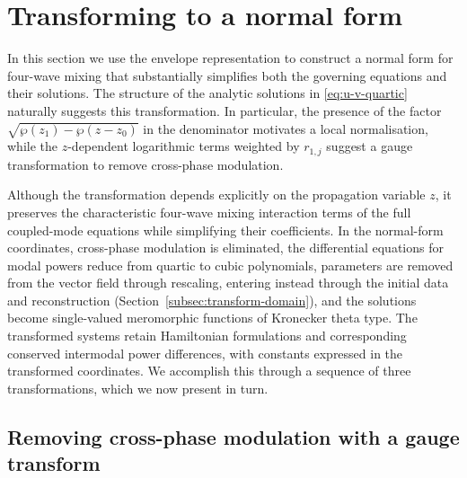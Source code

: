 \documentclass[11pt,a4paper]{article}
\numberwithin{equation}{section}
\begin{document}

\section{Transforming to a normal form} \label{sec:coord-transforms}

In this section we use the envelope representation to construct a normal form for four-wave mixing that substantially simplifies both the governing equations and their solutions.
The structure of the analytic solutions in \eqref{eq:u-v-quartic} naturally suggests this transformation.
In particular, the presence of the factor $\sqrt{\wp(z_1) - \wp(z - z_0)}$ in the denominator motivates a local normalisation, while the $z$-dependent logarithmic terms weighted by $r_{1,j}$ suggest a gauge transformation to remove cross-phase modulation.

Although the transformation depends explicitly on the propagation variable $z$, it preserves the characteristic four-wave mixing interaction terms of the full coupled-mode equations while simplifying their coefficients.
In the normal-form coordinates, cross-phase modulation is eliminated, the differential equations for modal powers reduce from quartic to cubic polynomials, parameters are removed from the vector field through rescaling, entering instead through the initial data and reconstruction (Section~\ref{subsec:transform-domain}), and the solutions become single-valued meromorphic functions of Kronecker theta type.
The transformed systems retain Hamiltonian formulations and corresponding conserved intermodal power differences, with constants expressed in the transformed coordinates.
We accomplish this through a sequence of three transformations, which we now present in turn.

\subsection{Removing cross-phase modulation with a gauge transform}
\end{document}
